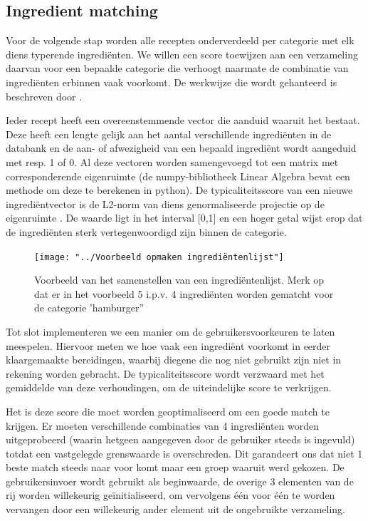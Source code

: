 \documentclass{hogent-article}
\begin{document}
\subsection{Ingredient matching}%

Voor de volgende stap worden alle recepten onderverdeeld per categorie met elk diens typerende ingrediënten. We willen een score toewijzen aan een verzameling daarvan voor een bepaalde categorie die verhoogt naarmate de combinatie van ingrediënten erbinnen vaak voorkomt. De werkwijze die wordt gehanteerd is beschreven door \textcite{Yokoi2015}.

Ieder recept heeft een overeenstemmende vector die aanduid waaruit het bestaat. Deze heeft een lengte gelijk aan het aantal verschillende ingrediënten in de databank en de aan- of afwezigheid van een bepaald ingrediënt wordt aangeduid met resp. 1 of 0. Al deze vectoren worden samengevoegd tot een matrix met  corresponderende eigenruimte (de numpy-bibliotheek Linear Algebra bevat een methode om deze te berekenen in python). De typicaliteitsscore van een nieuwe ingrediëntvector  \autocite{Yokoi2015} is de L2-norm van diens genormaliseerde projectie op de eigenruimte \autocite{Karabiber2024a}. De waarde ligt in het interval [0,1] en een hoger getal wijst erop dat de ingrediënten sterk vertegenwoordigd zijn binnen de categorie.

\begin{figure}
    \centering
    \texttt{[image: "../Voorbeeld opmaken ingrediëntenlijst"]}
    \caption[Voorbeeld van het samenstellen van een ingrediëntenlijst]{Voorbeeld van het samenstellen van een ingrediëntenlijst. Merk op dat er in het voorbeeld 5 i.p.v. 4 ingrediënten worden gematcht voor de categorie 'hamburger'' \autocite{Yokoi2015}}
    \label{fig:voorbeeld-opmaken-ingredientenlijst}
\end{figure}

Tot slot implementeren we een manier om de gebruikersvoorkeuren te laten meespelen. Hiervoor meten we hoe vaak een ingrediënt voorkomt in eerder klaargemaakte bereidingen, waarbij diegene die nog niet gebruikt zijn niet in rekening worden gebracht. De typicaliteitsscore wordt verzwaard met het gemiddelde van deze verhoudingen, om de uiteindelijke score te verkrijgen.

Het is deze score die moet worden geoptimaliseerd om een goede match te krijgen. Er moeten verschillende combinaties van 4 ingrediënten worden uitgeprobeerd (waarin hetgeen aangegeven door de gebruiker steeds is ingevuld) totdat een vastgelegde grenswaarde is overschreden. Dit garandeert ons dat niet 1 beste match steeds naar voor komt maar een groep waaruit werd gekozen. De gebruikersinvoer wordt gebruikt als beginwaarde, de overige 3 elementen van de rij worden willekeurig geïnitialiseerd, om vervolgens één voor één te worden vervangen door een willekeurig ander element uit de ongebruikte verzameling. 
\end{document}
